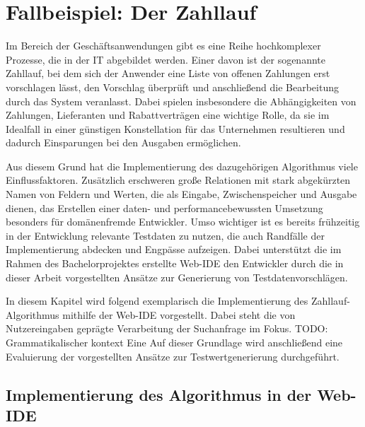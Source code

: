 \section{Fallbeispiel: Der Zahllauf}\label{chap:paymentrun}

Im Bereich der Geschäftsanwendungen gibt es eine Reihe hochkomplexer Prozesse, die in der IT abgebildet werden.
Einer davon ist der sogenannte Zahllauf, bei dem sich der Anwender eine Liste von offenen Zahlungen erst vorschlagen lässt, den Vorschlag überprüft und anschließend die Bearbeitung durch das System veranlasst.
Dabei spielen insbesondere die Abhängigkeiten von Zahlungen, Lieferanten und Rabattverträgen eine wichtige Rolle, da sie im Idealfall in einer günstigen Konstellation für das Unternehmen resultieren und dadurch Einsparungen bei den Ausgaben ermöglichen.

Aus diesem Grund hat die Implementierung des dazugehörigen Algorithmus viele Einflussfaktoren. 
Zusätzlich erschweren große Relationen mit stark abgekürzten Namen von Feldern und Werten, die als Eingabe, Zwischenspeicher und Ausgabe dienen, das Erstellen einer daten- und performancebewussten Umsetzung besonders für domänenfremde Entwickler.
Umso wichtiger ist es bereits frühzeitig in der Entwicklung relevante Testdaten zu nutzen, die auch Randfälle der Implementierung abdecken und Engpässe aufzeigen.
Dabei unterstützt die im Rahmen des Bachelorprojektes erstellte Web-IDE den Entwickler durch die in dieser Arbeit vorgestellten Ansätze zur Generierung von Testdatenvorschlägen.

In diesem Kapitel wird folgend exemplarisch die Implementierung des Zahllauf-Algorithmus mithilfe der Web-IDE vorgestellt.
Dabei steht die von Nutzereingaben geprägte Verarbeitung der Suchanfrage im Fokus.
TODO: Grammatikalischer kontext
Eine 
Auf dieser Grundlage wird anschließend eine Evaluierung der vorgestellten Ansätze zur Testwertgenerierung durchgeführt.

\subsection{Implementierung des Algorithmus in der Web-IDE}


